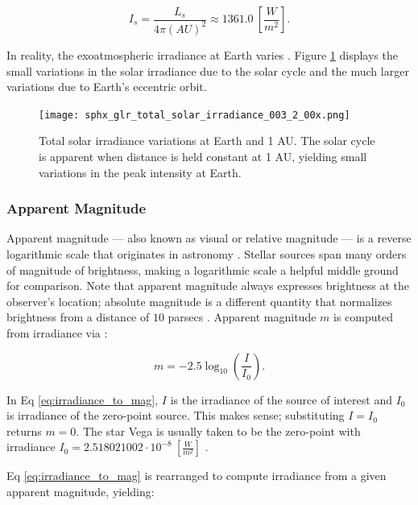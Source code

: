 \begin{equation} \label{eq:solar_constant_mean}
  I_s = \frac{L_s}{4\pi \left(AU\right)^2} \approx 1361.0 \: \left[ \frac{W}{m^2} \right].
\end{equation}

In reality, the exoatmospheric irradiance at Earth varies \cite{frueh2019notes}. Figure \ref{fig:tsi} displays the small variations in the solar irradiance due to the solar cycle and the much larger variations due to Earth's eccentric orbit.

\begin{figure}[ht]
  \centering
  \texttt{[image: sphx\_glr\_total\_solar\_irradiance\_003\_2\_00x.png]}
  \caption{Total solar irradiance variations at Earth and 1 AU. The solar cycle is apparent when distance is held constant at 1 AU, yielding small variations in the peak intensity at Earth.}
  \label{fig:tsi}
\end{figure}

\subsubsection{Apparent Magnitude}

Apparent magnitude ---  also known as visual or relative magnitude --- is a reverse logarithmic scale
that originates in astronomy \cite{frueh2019notes}. Stellar sources span many orders of magnitude of brightness, making a
logarithmic scale a helpful middle ground for comparison. Note that apparent magnitude always
expresses brightness at the observer's location; absolute magnitude is a different quantity that
normalizes brightness from a distance of $10$ parsecs \cite{frueh2019notes}. Apparent magnitude $m$
is computed from irradiance via \cite{frueh2019notes}:

\begin{equation} \label{eq:irradiance_to_mag}
  m = -2.5 \log_{10}\left( \frac{I}{I_0} \right).
\end{equation}

In Eq \ref{eq:irradiance_to_mag}, $I$ is the irradiance of the source of interest and $I_0$ is
irradiance of the zero-point source. This makes sense; substituting $I = I_0$ returns
$m=0$. The star Vega is usually taken to be the zero-point with irradiance $I_0 = 2.518021002\cdot
10^{-8} \: \left[ \frac{W}{m^2} \right]$ \cite{frueh2019notes}.

Eq \ref{eq:irradiance_to_mag} is rearranged to compute irradiance from a given apparent magnitude,
yielding:

